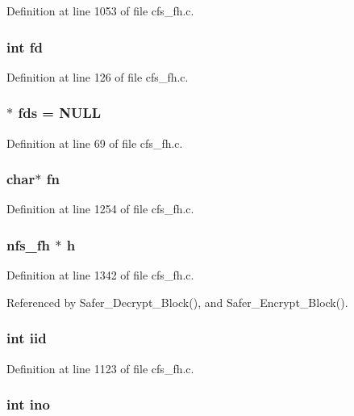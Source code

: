 Definition at line 1053 of file cfs\_\-fh.c.
\subsubsection{\setlength{\rightskip}{0pt plus 5cm}int {\bf fd}}\label{cfs__fh_8c_a8}




Definition at line 126 of file cfs\_\-fh.c.
\subsubsection{$\ast$ {\bf fds} = NULL}\label{cfs__fh_8c_a5}




Definition at line 69 of file cfs\_\-fh.c.
\subsubsection{\setlength{\rightskip}{0pt plus 5cm}char$\ast$ {\bf fn}}\label{cfs__fh_8c_a36}




Definition at line 1254 of file cfs\_\-fh.c.
\subsubsection{\setlength{\rightskip}{0pt plus 5cm}nfs\_\-fh $\ast$ {\bf h}}\label{cfs__fh_8c_a28}




Definition at line 1342 of file cfs\_\-fh.c.

Referenced by Safer\_\-Decrypt\_\-Block(), and Safer\_\-Encrypt\_\-Block().
\subsubsection{\setlength{\rightskip}{0pt plus 5cm}int {\bf iid}}\label{cfs__fh_8c_a32}




Definition at line 1123 of file cfs\_\-fh.c.
\subsubsection{\setlength{\rightskip}{0pt plus 5cm}int {\bf ino}}\label{cfs__fh_8c_a30}




